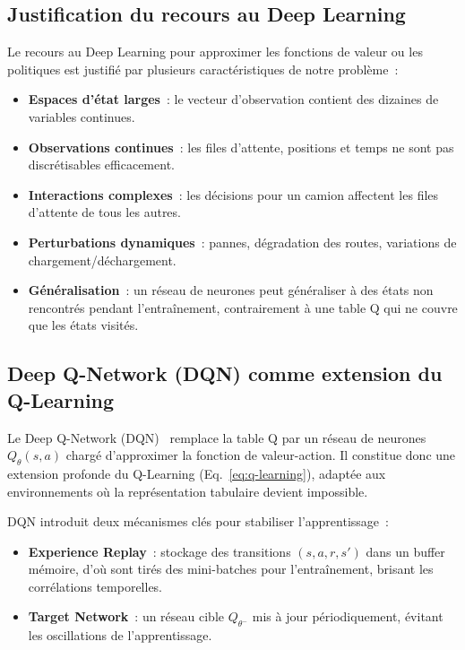\documentclass[11pt,a4paper]{report}
\begin{document}
\subsection{Justification du recours au Deep Learning}
\label{sec:justification-deep-learning}
Le recours au Deep Learning pour approximer les fonctions de valeur ou les politiques est justifié par plusieurs caractéristiques de notre problème~:
\begin{itemize}
    \item \textbf{Espaces d'état larges}~: le vecteur d'observation contient des dizaines de variables continues.
    \item \textbf{Observations continues}~: les files d'attente, positions et temps ne sont pas discrétisables efficacement.
    \item \textbf{Interactions complexes}~: les décisions pour un camion affectent les files d'attente de tous les autres.
    \item \textbf{Perturbations dynamiques}~: pannes, dégradation des routes, variations de chargement/déchargement.
    \item \textbf{Généralisation}~: un réseau de neurones peut généraliser à des états non rencontrés pendant l'entraînement, contrairement à une table Q qui ne couvre que les états visités.
\end{itemize}

\subsection{Deep Q-Network (DQN) comme extension du Q-Learning}
\label{sec:dqn}
Le Deep Q-Network (DQN)~\cite{MoezKrichen2022} remplace la table Q par un réseau de neurones $Q_\theta(s, a)$ chargé d'approximer la fonction de valeur-action. Il constitue donc une extension profonde du Q-Learning (Eq.~\ref{eq:q-learning}), adaptée aux environnements où la représentation tabulaire devient impossible.

DQN introduit deux mécanismes clés pour stabiliser l'apprentissage~:
\begin{itemize}
    \item \textbf{Experience Replay}~: stockage des transitions $(s, a, r, s')$ dans un buffer mémoire, d'où sont tirés des mini-batches pour l'entraînement, brisant les corrélations temporelles.
    \item \textbf{Target Network}~: un réseau cible $Q_{\theta^-}$ mis à jour périodiquement, évitant les oscillations de l'apprentissage.
\end{itemize}
\end{document}
